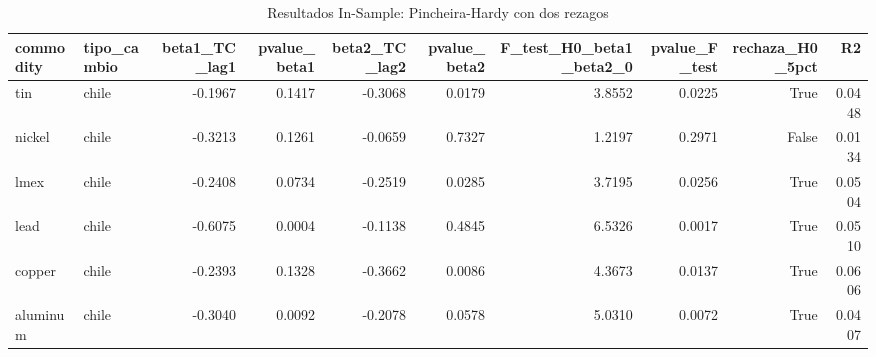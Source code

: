 \begin{table}
\caption{Resultados In-Sample: Pincheira-Hardy con dos rezagos}
\label{tab:res_g}
\begin{tabular}{llrrrrrrrr}
\toprule
commodity & tipo_cambio & beta1_TC_lag1 & pvalue_beta1 & beta2_TC_lag2 & pvalue_beta2 & F_test_H0_beta1_beta2_0 & pvalue_F_test & rechaza_H0_5pct & R2 \\
\midrule
tin & chile & -0.1967 & 0.1417 & -0.3068 & 0.0179 & 3.8552 & 0.0225 & True & 0.0448 \\
nickel & chile & -0.3213 & 0.1261 & -0.0659 & 0.7327 & 1.2197 & 0.2971 & False & 0.0134 \\
lmex & chile & -0.2408 & 0.0734 & -0.2519 & 0.0285 & 3.7195 & 0.0256 & True & 0.0504 \\
lead & chile & -0.6075 & 0.0004 & -0.1138 & 0.4845 & 6.5326 & 0.0017 & True & 0.0510 \\
copper & chile & -0.2393 & 0.1328 & -0.3662 & 0.0086 & 4.3673 & 0.0137 & True & 0.0606 \\
aluminum & chile & -0.3040 & 0.0092 & -0.2078 & 0.0578 & 5.0310 & 0.0072 & True & 0.0407 \\
\bottomrule
\end{tabular}
\end{table}
